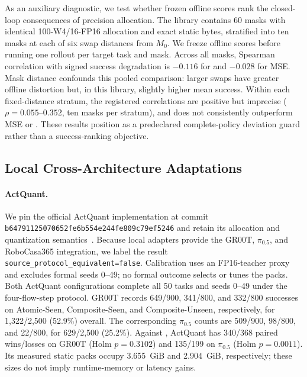 As an auxiliary diagnostic, we test whether frozen offline scores rank the closed-loop consequences of precision allocation. The library contains 60 masks with identical 100-W4/16-FP16 allocation and exact static bytes, stratified into ten masks at each of six swap distances from $M_0$. We freeze offline scores before running one rollout per target task and mask. Across all masks, Spearman correlation with signed success degradation is $-0.116$ for \dpac and $-0.028$ for MSE. Mask distance confounds this pooled comparison: larger swaps have greater offline distortion but, in this library, slightly higher mean success. Within each fixed-distance stratum, the registered \dpac correlations are positive but imprecise ($\rho=0.055$--$0.352$, ten masks per stratum), and \dpac does not consistently outperform MSE or \dfunc. These results position \dpac as a predeclared complete-policy deviation guard rather than a success-ranking objective.

\subsection{Local Cross-Architecture Adaptations}
\label{sec:local_adaptations}

\paragraph{ActQuant.}
We pin the official ActQuant implementation at commit \texttt{b64791125070652fe6b554e244fe809c79ef5246} and retain its allocation and quantization semantics~\citep{akbari2026actquant}. Because local adapters provide the GR00T, $\pi_{0.5}$, and RoboCasa365 integration, we label the result \texttt{source\_protocol\_equivalent=false}. Calibration uses an FP16-teacher proxy and excludes formal seeds 0--49; no formal outcome selects or tunes the packs. Both ActQuant configurations complete all 50 tasks and seeds 0--49 under the four-flow-step protocol. GR00T records 649/900, 341/800, and 332/800 successes on Atomic-Seen, Composite-Seen, and Composite-Unseen, respectively, for 1,322/2,500 (52.9\%) overall. The corresponding $\pi_{0.5}$ counts are 509/900, 98/800, and 22/800, for 629/2,500 (25.2\%). Against \method, ActQuant has 340/368 paired wins/losses on GR00T (Holm $p=0.3102$) and 135/199 on $\pi_{0.5}$ (Holm $p=0.0011$). Its measured static packs occupy 3.655~GiB and 2.904~GiB, respectively; these sizes do not imply runtime-memory or latency gains.

